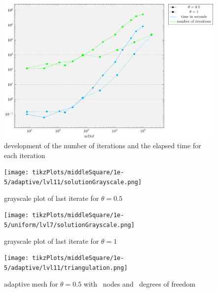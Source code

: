 \documentclass[draft=false,twoside,12pt]{scrreprt}
\begin{document}
\begin{figure}[H]
	\centering
	\includegraphics[width=14cm]{tikzPlots/middleSquare/misc.pdf}
  \caption{development of the number of iterations and the elapsed time for 
  each iteration}
\end{figure}

\begin{minipage}[t]{0.5\textwidth}
  \begin{figure}[H]
	  \centering
		\texttt{[image: tikzPlots/middleSquare/1e-5/adaptive/lvl11/solutionGrayscale.png]}
    \caption{grayscale plot of last iterate for $\theta = 0.5$}
  \end{figure}
\end{minipage}
\begin{minipage}[t]{0.5\textwidth}
  \begin{figure}[H]
	  \centering
		\texttt{[image: tikzPlots/middleSquare/1e-5/uniform/lvl7/solutionGrayscale.png]}
    \caption{grayscale plot of last iterate for $\theta = 1$}
  \end{figure}
\end{minipage}


\begin{figure}[H]
	\centering
  \texttt{[image: tikzPlots/middleSquare/1e-5/adaptive/lvl11/triangulation.png]}
  \caption{adaptive mesh for $\theta = 0.5$ with \nrNodes\ nodes and 
  \nrDof\ degrees of freedom}
\end{figure}

\end{document}
